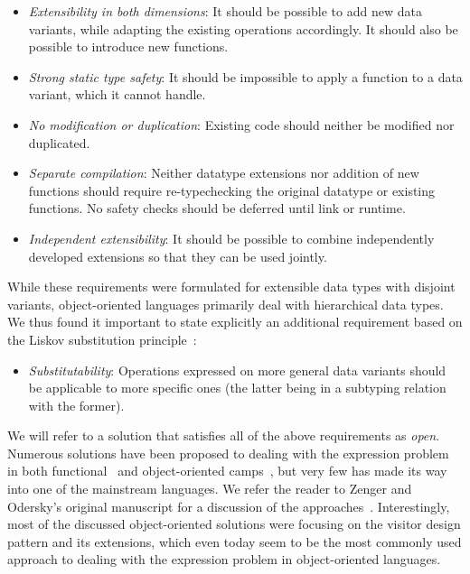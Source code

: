 \begin{itemize}
\setlength{\itemsep}{0pt}
\setlength{\parskip}{0pt}
\item \emph{Extensibility in both dimensions}: It should be possible to add new 
      data variants, while adapting the existing operations accordingly. It 
      should also be possible to introduce new functions. 
\item \emph{Strong static type safety}: It should be impossible to apply a 
      function to a data variant, which it cannot handle. 
\item \emph{No modification or duplication}: Existing code should neither be 
      modified nor duplicated.
\item \emph{Separate compilation}: Neither datatype extensions nor addition of 
      new functions should require re-typechecking the original datatype or 
      existing functions. No safety checks should be deferred until link or 
      runtime.
\item \emph{Independent extensibility}: It should be possible to combine 
      independently developed extensions so that they can be used jointly.
\end{itemize}

\noindent
While these requirements were formulated for extensible data types with 
disjoint variants, object-oriented languages primarily deal with 
hierarchical data types. We thus found it important to state explicitly an 
additional requirement based on the Liskov substitution principle~\cite{Lis87}:

\begin{itemize}
\setlength{\itemsep}{0pt}
\setlength{\parskip}{0pt}
\item \emph{Substitutability}: Operations expressed on more general data variants
      should be applicable to more specific ones (the latter being in a 
      subtyping relation with the former).
\end{itemize}


\noindent
We will refer to a solution that satisfies all of the above requirements as \emph{open}. 
Numerous solutions have been proposed to dealing with the expression problem in both 
functional~\cite{garrigue-98,LohHinze2006} and object-oriented 
camps~\cite{Palsberg98,Krishnamurthi98,Zenger:2001,runabout}, but very few has 
made its way into one of the mainstream languages. We refer the reader to Zenger 
and Odersky's original manuscript for a discussion of the approaches~\cite{fool12}.
Interestingly, most of the discussed object-oriented  
solutions were focusing on the visitor design pattern and its extensions, 
which even today seem to be the most commonly used approach to dealing with the 
expression problem in object-oriented languages.

